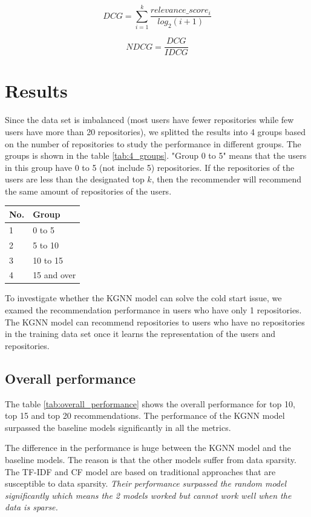 \documentclass[11pt,twoside]{report}
\begin{document}
\begin{equation}
    DCG=\sum_{i=1}^k\frac{relevance\_score_i}{log_2(i+1)}
    \label{eq:dcg}
\end{equation}

\begin{equation}
    NDCG=\frac{DCG}{IDCG}
    \label{eq:ndcg}
\end{equation}

\section{Results}
Since the data set is imbalanced (most users have fewer repositories while few users have more than 20 repositories), we splitted the results into 4 groups based on the number of repositories to study the performance in different groups. The groups is shown in the table \ref{tab:4_groups}. "Group 0 to 5" means that the users in this group have 0 to 5 (not include 5) repositories. If the repositories of the users are less than the designated top $k$, then the recommender will recommend the same amount of repositories of the users.

\begin{center}
    \begin{tabular}{l | l}
    \hline
    No. & Group \\
    \hline
    1 & 0 to 5 \\
    2 & 5 to 10 \\
    3 & 10 to 15 \\
    4 & 15 and over
    \end{tabular}
    \label{tab:4_groups}
\end{center}

To investigate whether the KGNN model can solve the cold start issue, we examed the recommendation performance in users who have only 1 repositories. The KGNN model can recommend repositories to users who have no repositories in the training data set once it learns the representation of the users and repositories.

\subsection{Overall performance}
The table \ref{tab:overall_performance} shows the overall performance for top 10, top 15 and top 20 recommendations. The performance of the KGNN model surpassed the baseline models significantly in all the metrics.

The difference in the performance is huge between the KGNN model and the baseline models. The reason is that the other models suffer from data sparsity. The TF-IDF and CF model are based on traditional approaches that are susceptible to data sparsity. \textit{Their performance surpassed the random model significantly which means the 2 models worked but cannot work well when the data is sparse.}
\end{document}
